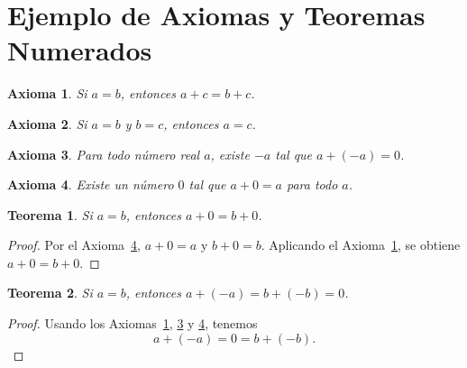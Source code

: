 \documentclass{article}
\newtheorem{axiom}{Axioma}
\newtheorem{theorem}{Teorema}
\begin{document}
\section*{Ejemplo de Axiomas y Teoremas Numerados}

\begin{axiom}\label{ax:1}
Si $a=b$, entonces $a+c=b+c$.
\end{axiom}

\begin{axiom}\label{ax:2}
Si $a=b$ y $b=c$, entonces $a=c$.
\end{axiom}

\begin{axiom}\label{ax:3}
Para todo número real $a$, existe $-a$ tal que $a + (-a) = 0$.
\end{axiom}

\begin{axiom}\label{ax:4}
Existe un número $0$ tal que $a+0=a$ para todo $a$.
\end{axiom}

\begin{theorem}\label{th:1}
Si $a=b$, entonces $a+0=b+0$.
\end{theorem}

\begin{proof}
Por el Axioma~\ref{ax:4}, $a+0=a$ y $b+0=b$.
Aplicando el Axioma~\ref{ax:1}, se obtiene $a+0=b+0$.
\end{proof}

\begin{theorem}\label{th:2}
Si $a=b$, entonces $a+(-a)=b+(-b)=0$.
\end{theorem}

\begin{proof}
Usando los Axiomas~\ref{ax:1}, \ref{ax:3} y \ref{ax:4}, tenemos
\[
a+(-a)=0=b+(-b).
\]
\end{proof}
\end{document}
